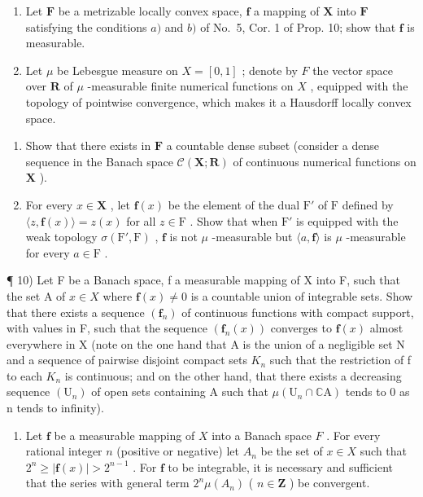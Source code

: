\begin{enumerate}
\def\labelenumi{\arabic{enumi})}
\setcounter{enumi}{7}
\item
  Let \(\mathbf{F}\) be a metrizable locally convex space, \(\mathbf{f}\) a mapping of \(\mathbf{X}\) into \(\mathbf{F}\) satisfying the conditions \(a)\) and \(b)\) of No.~5, Cor. 1 of Prop. 10; show that \(\mathbf{f}\) is measurable.
\item
  Let \(\mu\) be Lebesgue measure on \(X = [0,1]\) ; denote by \(F\) the vector space over \(\mathbf{R}\) of \(\mu\) -measurable finite numerical functions on \(X\) , equipped with the topology of pointwise convergence, which makes it a Hausdorff locally convex space.
\end{enumerate}

\begin{enumerate}
\def\labelenumi{\alph{enumi})}
\item
  Show that there exists in \(\mathbf{F}\) a countable dense subset (consider a dense sequence in the Banach space \(\mathcal{C}(\mathbf{X};\mathbf{R})\) of continuous numerical functions on \(\mathbf{X}\) ).
\item
  For every \(x \in \mathbf{X}\) , let \(\mathbf{f}(x)\) be the element of the dual \(\mathrm{F}'\) of \(\mathrm{F}\) defined by \(\langle z, \mathbf{f}(x) \rangle = z(x)\) for all \(z \in \mathrm{F}\) . Show that when \(\mathrm{F}'\) is equipped with the weak topology \(\sigma(\mathrm{F}', \mathrm{F})\) , \(\mathbf{f}\) is not \(\mu\) -measurable but \(\langle a, \mathbf{f} \rangle\) is \(\mu\) -measurable for every \(a \in \mathrm{F}\) .
\end{enumerate}

¶ 10) Let F be a Banach space, f a measurable mapping of X into F, such that the set A of \(x \in X\) where \(\mathbf{f}(x) \neq 0\) is a countable union of integrable sets. Show that there exists a sequence \((\mathbf{f}_n)\) of continuous functions with compact support, with values in F, such that the sequence \((\mathbf{f}_n(x))\) converges to \(\mathbf{f}(x)\) almost everywhere in X (note on the one hand that A is the union of a negligible set N and a sequence of pairwise disjoint compact sets \(K_n\) such that the restriction of f to each \(K_n\) is continuous; and on the other hand, that there exists a decreasing sequence \((\mathrm{U}_n)\) of open sets containing A such that \(\mu(\mathrm{U}_n \cap \mathbb{C}\mathrm{A})\) tends to 0 as n tends to infinity).

\begin{enumerate}
\def\labelenumi{\arabic{enumi})}
\setcounter{enumi}{10}
\tightlist
\item
  Let \(\mathbf{f}\) be a measurable mapping of \(X\) into a Banach space \(F\) . For every rational integer \(n\) (positive or negative) let \(A_{n}\) be the set of \(x \in X\) such that \(2^{n} \geqslant |\mathbf{f}(x)| > 2^{n-1}\) . For \(\mathbf{f}\) to be integrable, it is necessary and sufficient that the series with general term \(2^{n}\mu(A_{n})\) ( \(n \in \mathbf{Z}\) ) be convergent.
\end{enumerate}

